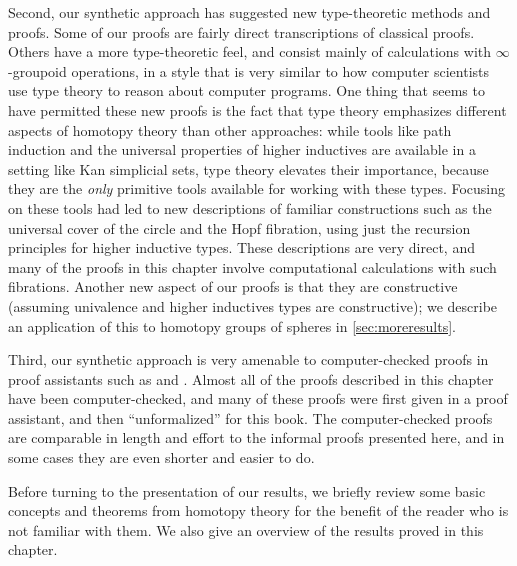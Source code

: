 Second, our synthetic approach has suggested new type-theoretic
methods and proofs.  Some of our proofs are fairly
direct transcriptions of classical proofs.  Others have a more
type-theoretic feel, and consist mainly of calculations with
$\infty$-groupoid operations, in a style that is very similar to how
computer scientists use type theory to reason about computer programs.
One thing that seems to have permitted these new proofs is the fact that type theory
emphasizes different aspects of homotopy theory than other approaches:
while tools like path induction and the universal properties of higher
inductives are available in a setting like Kan simplicial sets, type
theory elevates their importance, because they are the \emph{only}
primitive tools available for working with these types.  Focusing on
these tools had led to new descriptions of familiar constructions such
as the universal cover of the circle and the Hopf fibration, using just the
recursion principles for higher inductive types.  These descriptions are
very direct, and many of the proofs in this chapter involve
computational calculations with such fibrations.
%
Another new aspect of our proofs is that they are constructive (assuming
univalence and higher inductives types are constructive); we describe an
application of this to homotopy groups of spheres in
\cref{sec:moreresults}.    

%
%
Third, our synthetic approach is very amenable to computer-checked
proofs in proof assistants such as \Coq and \Agda.
Almost all of the proofs
described in this chapter have been computer-checked, and many of these
proofs were first given in a proof assistant, and then ``unformalized''
for this book.  The computer-checked proofs are comparable in length and
effort to the informal proofs presented here, and in some cases they are
even shorter and easier to do.  

\mentalpause

Before turning to the presentation of our results, we briefly review some
 basic concepts and theorems from homotopy theory for the benefit of the reader who is not familiar with them.
 We also give an overview of the
results proved in this chapter.  

